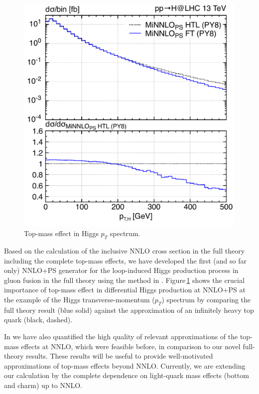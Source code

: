 \documentclass{FBR_Bericht_2025}
\begin{document}
\begin{refsection}
\begin{figure}[h!]
\begin{center}
\includegraphics[width=0.95\linewidth]{plots/ptH_diphotons_mass_effect.pdf}
\caption{Top-mass effect in Higgs $p_T$ spectrum.}
\label{fig:topmass_Higgs_pT}
\end{center}
\end{figure}
%
Based on the calculation of the inclusive NNLO cross section in the full theory
including the complete top-mass effects,
we have developed the first (and so far only) 
NNLO+PS generator for the loop-induced 
Higgs production process in gluon fusion in the full theory using 
the \minnlo{} method in . Figure\,\ref{fig:topmass_Higgs_pT} shows
the crucial importance of top-mass effect in differential Higgs production
at NNLO+PS at the example of the Higgs transverse-momentum ($p_T$)
spectrum by comparing the full theory result (blue solid) against
the approximation of an infinitely heavy top quark (black, dashed).

In  we have also quantified the high quality of relevant approximations 
of the top-mass effects at NNLO, which were feasible before, in comparison to our 
novel full-theory results. These results will be useful to provide well-motivated 
approximations of top-mass effects beyond NNLO. Currently, we are extending 
our \minnlo{} calculation by the complete dependence on light-quark mass 
effects (bottom and charm) up to NNLO.
%

\end{refsection}
\end{document}
